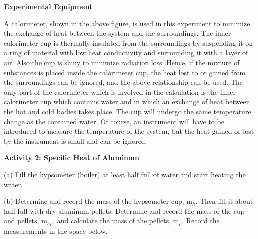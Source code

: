 \vspace{0.3cm}
{\centering {}  \par}
\vspace{0.3cm}

\textbf{Experimental Equipment} 

A calorimeter, shown in the above figure, is used in this experiment
to minimize the exchange of heat between the system and the surroundings.
The inner calorimeter cup is thermally insulated from the surroundings
by suspending it on a ring of material with low heat conductivity
and surrounding it with a layer of air. Also the cup is shiny to minimize
radiation loss. Hence, if the mixture of substances is placed inside
the calorimeter cup, the heat lost to or gained from the surroundings
can be ignored, and the above relationship can be used. The only part
of the calorimeter which is involved in the calculation is the inner
calorimeter cup which contains water and in which an exchange of heat
between the hot and cold bodies takes place. The cup will undergo
the same temperature change as the contained water. Of course, an
instrument will have to be introduced to measure the temperature of
the system, but the heat gained or lost by the instrument is small
and can be ignored.

\textbf{Activity 2: Specific Heat of Aluminum}

(a) Fill the hypsometer (boiler) at least half full of water and start
heating the water.

(b) Determine and record the mass of the hypsometer cup, m\( _{h} \).
Then fill it about half full with dry aluminum pellets. Determine
and record the mass of the cup and pellets, m\( _{hp} \), and calculate
the mass of the pellets, m\( _{p} \). Record the measurements in
the space below.
\vspace{15mm}

